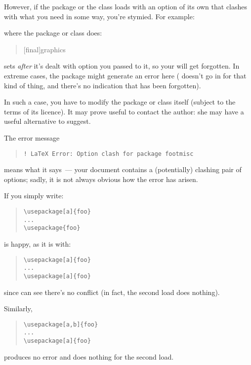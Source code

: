 However, if the  package or the  class loads
 with an option of its own that clashes with
what you need in some way, you're stymied.  For example:
\begin{quote}
\end{quote}
where the package or class does:
\begin{quote}
[final]{graphics}
\end{quote}
sets  \emph{after} it's dealt with option you passed to
it, so your  will get forgotten.  In extreme cases,
the package might generate an error here ( doesn't
go in for that kind of thing, and there's no indication that
 has been forgotten).

In such a case, you have to modify the package or class itself
(subject to the terms of its licence).  It may prove useful to contact
the author: she may have a useful alternative to suggest.


The error message
\begin{quote}
\begin{verbatim}
! LaTeX Error: Option clash for package footmisc
\end{verbatim}
\end{quote}
means what it says~--- your document contains a (potentially) clashing
pair of options; sadly, it is not always obvious how the error has
arisen.

If you simply write:
\begin{quote}
\begin{verbatim}
\usepackage[a]{foo}
...
\usepackage{foo}
\end{verbatim}
\end{quote}
\latex{} is happy, as it is with:
\begin{quote}
\begin{verbatim}
\usepackage[a]{foo}
...
\usepackage[a]{foo}
\end{verbatim}
\end{quote}
since \latex{} can see there's no conflict (in fact, the second load
does nothing).

Similarly,
\begin{quote}
\begin{verbatim}
\usepackage[a,b]{foo}
...
\usepackage[a]{foo}
\end{verbatim}
\end{quote}
produces no error and does nothing for the second load.

